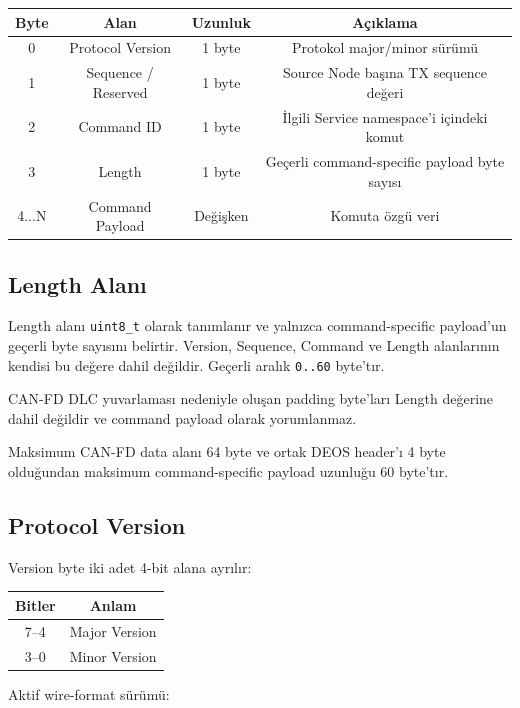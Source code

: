 \documentclass[a4paper,10pt]{article}
\newcommand{\code}[1]{\texttt{#1}}
\begin{document}
\begin{center}
\begin{tabular}{c c c c}
\toprule
Byte & Alan & Uzunluk & Açıklama \\
\midrule
0 & Protocol Version & 1 byte & Protokol major/minor sürümü \\
1 & Sequence / Reserved & 1 byte & Source Node başına TX sequence değeri \\
2 & Command ID & 1 byte & İlgili Service namespace'i içindeki komut \\
3 & Length & 1 byte & Geçerli command-specific payload byte sayısı \\
4...N & Command Payload & Değişken & Komuta özgü veri \\
\bottomrule
\end{tabular}
\end{center}

\subsection{Length Alanı}

Length alanı \code{uint8\_t} olarak tanımlanır ve yalnızca command-specific payload'un
geçerli byte sayısını belirtir. Version, Sequence, Command ve Length alanlarının kendisi
bu değere dahil değildir. Geçerli aralık \code{0..60} byte'tır.

CAN-FD DLC yuvarlaması nedeniyle oluşan padding byte'ları Length değerine dahil değildir
ve command payload olarak yorumlanmaz.

Maksimum CAN-FD data alanı 64 byte ve ortak DEOS header'ı 4 byte olduğundan maksimum
command-specific payload uzunluğu 60 byte'tır.

\subsection{Protocol Version}

Version byte iki adet 4-bit alana ayrılır:

\begin{center}
\begin{tabular}{c c}
\toprule
Bitler & Anlam \\
\midrule
7--4 & Major Version \\
3--0 & Minor Version \\
\bottomrule
\end{tabular}
\end{center}

Aktif wire-format sürümü:
\end{document}
